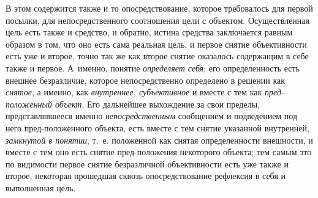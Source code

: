 {{В этом содержится также и то опосредствование, которое
требовалось для первой посылки, для непосредственного соотношения цели с
объектом. Осуществленная цель есть также и средство, и обратно, истина
средства заключается равным образом в том, что оно есть сама реальная цель,
и первое снятие объективности есть уже и второе, точно так же как второе
снятие оказалось содержащим в себе также и первое. А~именно, понятие
{\em определяет себя};
его определенность есть внешнее безразличие, которое
непосредственно определено в решении как
{\em снятое}, а именно,
как {\em внутреннее, субъективное}
и вместе с тем как
{\em пред-положенный
объект}. Его дальнейшее выхождение за свои пределы,
представлявшееся именно
{\em непосредственным}
сообщением и подведением под него пред-положенного объекта,
есть вместе с тем снятие указанной внутренней,
{\em замкнутой в понятии},
т.~е. положенной как снятая определенности внешности, и
вместе с тем оно есть снятие пред-положения некоторого объекта; тем самым
это по видимости первое снятие безразличной объективности
есть уже также и второе, некоторая прошедшая сквозь опосредствование
рефлексия в себя и выполненная цель.

}}

